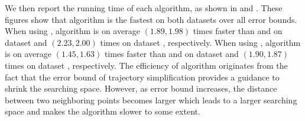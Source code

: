 We then report the running time of each algorithm, as shown in  and . These figures show that algorithm \stmm is the fastest on both datasets over all error bounds.
When using \sed, algorithm \stmm is on average {$(1.89, 1.98)$} times faster than \hmmbased
and \gfbased on dataset \pubdata and {$(2.23, 2.00)$} times on dataset \sercar, respectively.
When using \ped, algorithm \stmm is on average {$(1.45, 1.63)$} times faster than \hmmbased
and \gfbased on dataset \pubdata and {$(1.90, 1.87)$} times on dataset \sercar, respectively.
%
The efficiency of algorithm \stmm originates from the fact that the error
bound of trajectory simplification provides a guidance to shrink the searching
space.
However, as error bound increases, the distance between two neighboring points
becomes larger which leads to a larger searching space and makes the algorithm slower to some extent.






